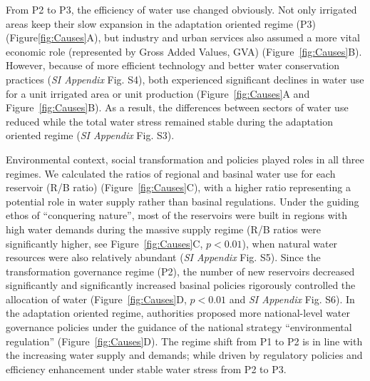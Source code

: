 From P2 to P3, the efficiency of water use changed obviously.
Not only irrigated areas keep their slow expansion in the adaptation oriented regime (P3) (Figure\ref{fig:Causes}A), but industry and urban services also assumed a more vital economic role (represented by Gross Added Values, GVA) (Figure~\ref{fig:Causes}B).
However, because of more efficient technology and better water conservation practices (\textit{SI Appendix} Fig. S4), both experienced significant declines in water use for a unit irrigated area or unit production (Figure~\ref{fig:Causes}A and Figure~\ref{fig:Causes}B).
As a result, the differences between sectors of water use reduced while the total water stress remained stable during the adaptation oriented regime (\textit{SI Appendix} Fig. S3).

Environmental context, social transformation and policies played roles in all three regimes.
We calculated the ratios of regional and basinal water use for each reservoir (R/B ratio) (Figure~\ref{fig:Causes}C), with a higher ratio representing a potential role in water supply rather than basinal regulations.
Under the guiding ethos of ``conquering nature'', most of the reservoirs were built in regions with high water demands during the massive supply regime (R/B ratios were significantly higher, see Figure~\ref{fig:Causes}C, $p<0.01$), when natural water resources were also relatively abundant (\textit{SI Appendix} Fig. S5).
Since the transformation governance regime (P2), the number of new reservoirs decreased significantly and significantly increased basinal policies rigorously controlled the allocation of water (Figure~\ref{fig:Causes}D, $p<0.01$ and \textit{SI Appendix} Fig. S6).
In the adaptation oriented regime, authorities proposed more national-level water governance policies under the guidance of the national strategy ``environmental regulation'' (Figure~\ref{fig:Causes}D).
The regime shift from P1 to P2 is in line with the increasing water supply and demands; while driven by regulatory policies and efficiency enhancement under stable water stress from P2 to P3.
